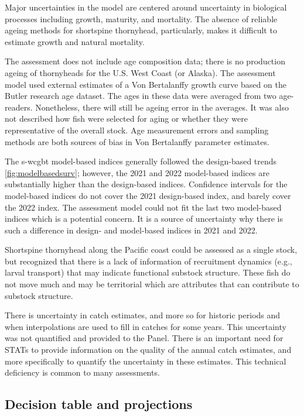 \documentclass[11pt,
  english,
  letterpaper,
]{article}
\begin{document}
Major uncertainties in the model are centered around uncertainty in biological processes including growth, maturity, and mortality. The absence of reliable ageing methods for shortspine thornyhead, particularly, makes it difficult to estimate growth and natural mortality.

The assessment does not include age composition data; there is no production ageing of thornyheads for the U.S. West Coast (or Alaska). The assessment model used external estimates of a Von Bertalanffy growth curve based on the Butler research age dataset. The ages in these data were averaged from two age-readers. Nonetheless, there will still be ageing error in the averages. It was also not described how fish were selected for aging or whether they were representative of the overall stock. Age measurement errors and sampling methods are both sources of bias in Von Bertalanffy parameter estimates.

The \gls{s-wcgbt} model-based indices generally followed the design-based trends \ref{fig:modelbasedsurv}; however, the 2021 and 2022 model-based indices are substantially higher than the design-based indices. Confidence intervals for the model-based indices do not cover the 2021 design-based index, and barely cover the 2022 index. The assessment model could not fit the last two model-based indices which is a potential concern. It is a source of uncertainty why there is such a difference in design- and model-based indices in 2021 and 2022.

Shortspine thornyhead along the Pacific coast could be assessed as a single stock, but recognized that there is a lack of information of recruitment dynamics (e.g., larval transport) that may indicate functional substock structure. These fish do not move much and may be territorial which are attributes that can contribute to substock structure.

There is uncertainty in catch estimates, and more so for historic periods and when interpolations are used to fill in catches for some years. This uncertainty was not quantified and provided to the Panel. There is an important need for STATs to provide information on the quality of the annual catch estimates, and more specifically to quantify the uncertainty in these estimates. This technical deficiency is common to many assessments.

\hypertarget{decision-table-and-projections}{%
\subsection*{Decision table and projections}\label{decision-table-and-projections}}
\end{document}
